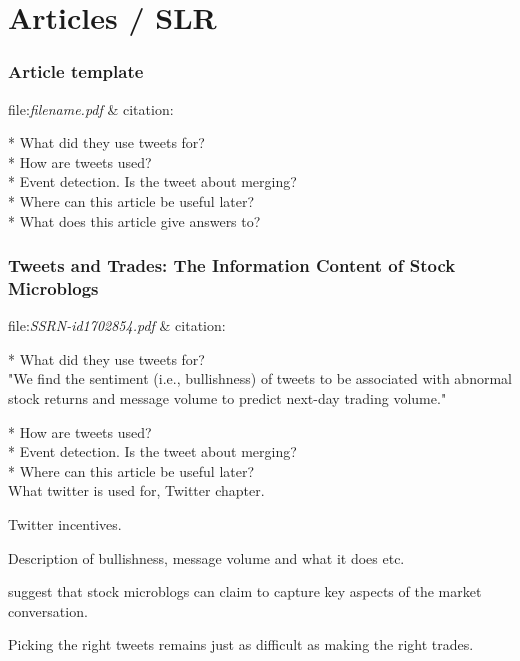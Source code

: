 \section{Articles / SLR}

\subsubsection{Article template}
file:\textit{filename.pdf} & citation:\cite[]{}  

* What did they use tweets for?\\
* How are tweets used?\\
* Event detection. Is the tweet about merging? \\
* Where can this article be useful later? \\
* What does this article give answers to?\\


\subsubsection{Tweets and Trades: The Information Content of Stock Microblogs}
file:\textit{SSRN-id1702854.pdf} & citation:\cite[]{sprenger10} %

* What did they use tweets for?\\
"We find the sentiment (i.e., bullishness) of tweets to be associated with abnormal
stock returns and message volume to predict next-day trading volume."
\cite[]{sprenger10} 

* How are tweets used?\\

* Event detection. Is the tweet about merging? \\

* Where can this article be useful later? \\
What twitter is used for, Twitter chapter. 

Twitter incentives. \cite[p4]{sprenger10}

Description of bullishness, message volume and what it does etc. 

\cite[p52]{sprenger10} suggest that stock microblogs can claim to capture key aspects of the market
conversation.

Picking the right tweets remains just as difficult as making the
right trades.

